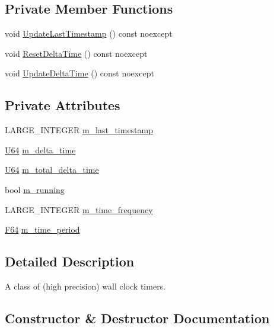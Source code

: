 \subsection*{Private Member Functions}
\begin{DoxyCompactItemize}
\item 
void \hyperlink{classmage_1_1_timer_ad0ff38a28efd65e7c147c8c399245d06}{Update\+Last\+Timestamp} () const noexcept
\item 
void \hyperlink{classmage_1_1_timer_a5b66b3bfbed7cd4a3ad565abec5c3b02}{Reset\+Delta\+Time} () const noexcept
\item 
void \hyperlink{classmage_1_1_timer_a10f12ad8645e8022a09067f1393c065b}{Update\+Delta\+Time} () const noexcept
\end{DoxyCompactItemize}
\subsection*{Private Attributes}
\begin{DoxyCompactItemize}
\item 
L\+A\+R\+G\+E\+\_\+\+I\+N\+T\+E\+G\+ER \hyperlink{classmage_1_1_timer_a6effbc37827492397cc781a78165a08a}{m\+\_\+last\+\_\+timestamp}
\item 
\hyperlink{namespacemage_a6672cf3c861707ce4a3235a3eb43941d}{U64} \hyperlink{classmage_1_1_timer_a2a6fcda6238524401de58b4462121286}{m\+\_\+delta\+\_\+time}
\item 
\hyperlink{namespacemage_a6672cf3c861707ce4a3235a3eb43941d}{U64} \hyperlink{classmage_1_1_timer_a597eae6b756d0f50bcb1541db0f1c7f0}{m\+\_\+total\+\_\+delta\+\_\+time}
\item 
bool \hyperlink{classmage_1_1_timer_ac8d975843e5b2199848284de910d3291}{m\+\_\+running}
\item 
L\+A\+R\+G\+E\+\_\+\+I\+N\+T\+E\+G\+ER \hyperlink{classmage_1_1_timer_a64e9afd31a95058e1736e84122c663d3}{m\+\_\+time\+\_\+frequency}
\item 
\hyperlink{namespacemage_ad26233bbec640deda836e572c1a23708}{F64} \hyperlink{classmage_1_1_timer_a666e06f94a9c5875ab6cbce8d2750a11}{m\+\_\+time\+\_\+period}
\end{DoxyCompactItemize}


\subsection{Detailed Description}
A class of (high precision) wall clock timers. 

\subsection{Constructor \& Destructor Documentation}
\hypertarget{classmage_1_1_timer_a5e1c0a3bb4491b3a43ce05874ad24055}{}\label{classmage_1_1_timer_a5e1c0a3bb4491b3a43ce05874ad24055} 

